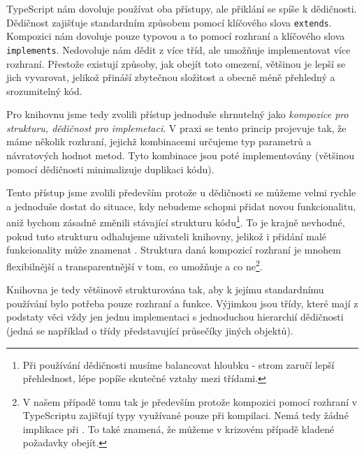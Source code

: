 TypeScript nám dovoluje používat oba přístupy, ale přiklání se spíše k dědičnosti.
Dědičnost zajišťuje standardním způsobem pomocí klíčového slova \texttt{extends}\cite{mdn:extends}.
Kompozici nám dovoluje pouze typovou a to pomocí rozhraní a klíčového slova \texttt{implements}\cite{TypeScript:classes}.
Nedovoluje nám dědit z více tříd, ale umožňuje implementovat více rozhraní\cite{TypeScript:classes}.
Přestože existují způsoby, jak obejít toto omezení\cite{TypeScript:mixins}, většinou je lepší se jich vyvarovat, jelikož přináší zbytečnou složitost a obecně méně přehledný a srozumitelný kód.

Pro knihovnu jsme tedy zvolili přístup jednoduše shrnutelný jako \textit{kompozice pro strukturu, dědičnost pro implemetaci}\cite{geometryjs:wiki:code-structure}.
V praxi se tento princip projevuje tak, že máme několik rozhraní, jejichž kombinacemi určujeme typ parametrů a návratových hodnot metod.
Tyto kombinace jsou poté implementovány (většinou pomocí dědičnosti minimalizuje duplikaci kódu).

Tento přístup jsme zvolili především protože u dědičnosti se můžeme velmi rychle a jednoduše dostat do situace, kdy nebudeme schopni přidat novou funkcionalitu, aniž bychom zásadně změnili stávající strukturu kódu\footnote{Při používání dědičnosti musíme balancovat hloubku  -  strom zaručí lepší přehlednost,  lépe popíše skutečné vztahy mezi třídami.}.
To je krajně nevhodné, pokud tuto strukturu odhalujeme uživateli knihovny, jelikož i přidání malé funkcionality může znamenat .
Struktura daná kompozicí rozhraní je mnohem flexibilnější a transparentnější v tom, co umožňuje a co ne\footnote{V našem případě tomu tak je především protože kompozici pomocí rozhraní v TypeScriptu zajišťují typy využívané pouze při kompilaci. Nemá tedy žádné implikace při . To také znamená, že můžeme v krizovém případě kladené požadavky obejít.}.

Knihovna je tedy většinově strukturována tak, aby k jejímu standardnímu používání bylo potřeba  pouze rozhraní a funkce\cite{geometryjs:wiki:code-structure}.
Výjimkou jsou třídy, které mají z podstaty věci vždy jen jednu implementaci s jednoduchou hierarchií dědičnosti (jedná se například o třídy představující průsečíky jiných objektů)\cite{geometryjs:source:geometryObjects:intersections}.
